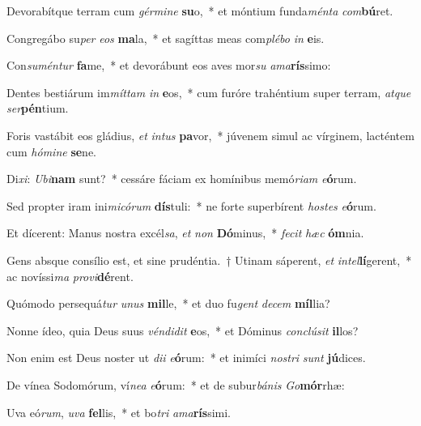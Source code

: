\item Devorabítque terram cum \textit{gér}\textit{mi}\textit{ne} \textbf{su}o,~* et móntium funda\textit{mén}\textit{ta} \textit{com}\textbf{bú}ret.
\item Congregábo su\textit{per} \textit{e}\textit{os} \textbf{ma}la,~* et sagíttas meas com\textit{plé}\textit{bo} \textit{in} \textbf{e}is.
\item Con\textit{su}\textit{mén}\textit{tur} \textbf{fa}me,~* et devorábunt eos aves mor\textit{su} \textit{a}\textit{ma}\textbf{rís}simo:
\item Dentes bestiárum im\textit{mít}\textit{tam} \textit{in} \textbf{e}os,~* cum furóre trahéntium super terram, \textit{at}\textit{que} \textit{ser}\textbf{pén}tium.
\item Foris vastábit eos gládius, \textit{et} \textit{in}\textit{tus} \textbf{pa}vor,~* júvenem simul ac vírginem, lacténtem cum \textit{hó}\textit{mi}\textit{ne} \textbf{se}ne.
\item Di\textit{xi}: \textit{U}\textit{bi}\textbf{nam} sunt?~* cessáre fáciam ex homínibus memó\textit{ri}\textit{am} \textit{e}\textbf{ó}rum.
\item Sed propter iram ini\textit{mi}\textit{có}\textit{rum} \textbf{dís}tuli:~* ne forte superbírent \textit{hos}\textit{tes} \textit{e}\textbf{ó}rum.
\item Et dícerent: Manus nostra excél\textit{sa}, \textit{et} \textit{non} \textbf{Dó}minus,~* \textit{fe}\textit{cit} \textit{hæc} \textbf{óm}nia.
\item Gens absque consílio est, et sine prudéntia.~† Utinam sáperent, \textit{et} \textit{in}\textit{tel}\textbf{lí}gerent,~* ac novíssi\textit{ma} \textit{pro}\textit{vi}\textbf{dé}rent.
\item Quómodo persequá\textit{tur} \textit{u}\textit{nus} \textbf{mil}le,~* et duo fu\textit{gent} \textit{de}\textit{cem} \textbf{míl}lia?
\item Nonne ídeo, quia Deus suus \textit{vén}\textit{di}\textit{dit} \textbf{e}os,~* et Dóminus \textit{con}\textit{clú}\textit{sit} \textbf{il}los?
\item Non enim est Deus noster ut \textit{di}\textit{i} \textit{e}\textbf{ó}rum:~* et inimíci \textit{nos}\textit{tri} \textit{sunt} \textbf{jú}dices.
\item De vínea Sodomórum, ví\textit{ne}\textit{a} \textit{e}\textbf{ó}rum:~* et de subur\textit{bá}\textit{nis} \textit{Go}\textbf{mór}rhæ:
\item Uva eó\textit{rum}, \textit{u}\textit{va} \textbf{fel}lis,~* et bo\textit{tri} \textit{a}\textit{ma}\textbf{rís}simi.

